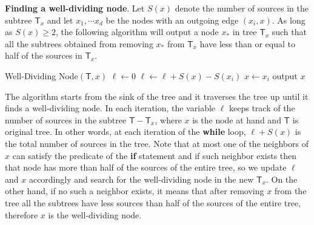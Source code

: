 \documentclass{article}
\def\A{{\sf A}}
\newcommand{\T}{{\mathsf T}}
\begin{document}
  \textbf{Finding a well-dividing node}.
Let $S(x)$ denote the number of sources in the subtree $\T_x$ and let $x_1, \cdots x_d$  be the nodes with an outgoing edge $(x_i,x)$. As long as $S(x)\geq 2$, the following algorithm will output a node $x_*$ in tree $\T_x$ such that  all the subtrees obtained from removing $x_*$ from $\T_x$ have less than or equal to half of the sources in $\T_x$.

\hspace{2mm}
\begin{algorithmic}
\State Well-Dividing Node$(\T,x)$
\State $\ell \gets 0$ 
 	   \State $\ell\gets \ell+S(x)-S(x_i)$ 
 	   \State $x \gets x_i$
	\Else
	\EndIf
\EndWhile
\State output $x$
\end{algorithmic}
\hspace{1mm}

The algorithm starts from the sink of the tree and it traverses the tree up until it finds a well-dividing node. In each iteration, the variable $\ell$ keeps track of the number of sources in the subtree $\T-\T_x$, where $x$ is the node at hand and $\T$ is original tree. In other words, at each iteration of the \textbf{while} loop, $\ell + S(x)$ is the total number of sources in the tree. Note that at most one of the neighbors of $x$ can satisfy the predicate of the \textbf{if} statement and if such neighbor exists then that node has more than half of the sources of the entire tree, so we update $\ell$ and $x$ accordingly and search for the well-dividing node in the new $\T_x$. On the other hand, if no such a neighbor exists, it means that after removing $x$ from the tree all the subtrees have less sources than half of the sources of the entire tree, therefore $x$ is the well-dividing node. 

\end{document}
